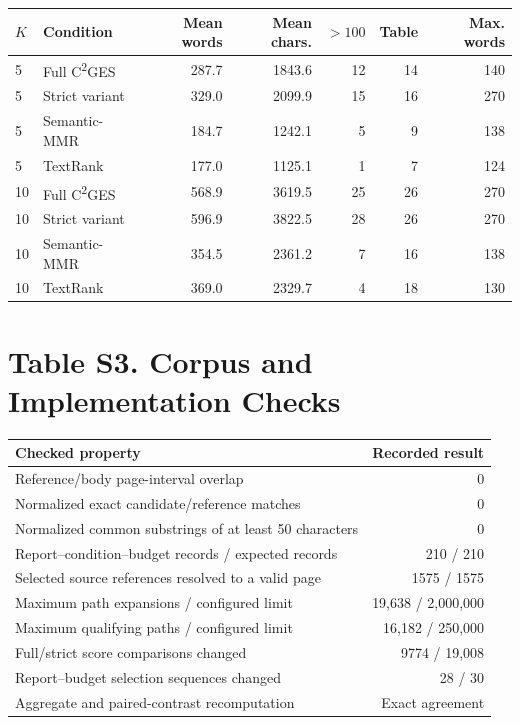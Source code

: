 \documentclass[11pt]{article}
\newcommand{\cges}{C\textsuperscript{2}GES}
\begin{document}
\begin{center}
\small
\begin{tabular}{llrrrrr}
\toprule
$K$ & Condition & Mean words & Mean chars. & $>100$ & Table & Max. words\\
\midrule
5 & Full \cges{} & 287.7 & 1843.6 & 12 & 14 & 140\\
5 & Strict variant & 329.0 & 2099.9 & 15 & 16 & 270\\
5 & Semantic-MMR & 184.7 & 1242.1 & 5 & 9 & 138\\
5 & TextRank & 177.0 & 1125.1 & 1 & 7 & 124\\
10 & Full \cges{} & 568.9 & 3619.5 & 25 & 26 & 270\\
10 & Strict variant & 596.9 & 3822.5 & 28 & 26 & 270\\
10 & Semantic-MMR & 354.5 & 2361.2 & 7 & 16 & 138\\
10 & TextRank & 369.0 & 2329.7 & 4 & 18 & 130\\
\bottomrule
\end{tabular}
\end{center}

\section*{Table S3. Corpus and Implementation Checks}

\begin{center}
\begin{tabularx}{\textwidth}{Xr}
\toprule
Checked property & Recorded result\\
\midrule
Reference/body page-interval overlap & 0\\
Normalized exact candidate/reference matches & 0\\
Normalized common substrings of at least 50 characters & 0\\
Report--condition--budget records / expected records & 210 / 210\\
Selected source references resolved to a valid page & 1575 / 1575\\
Maximum path expansions / configured limit & 19,638 / 2,000,000\\
Maximum qualifying paths / configured limit & 16,182 / 250,000\\
Full/strict score comparisons changed & 9774 / 19,008\\
Report--budget selection sequences changed & 28 / 30\\
Aggregate and paired-contrast recomputation & Exact agreement\\
\bottomrule
\end{tabularx}
\end{center}
\end{document}
